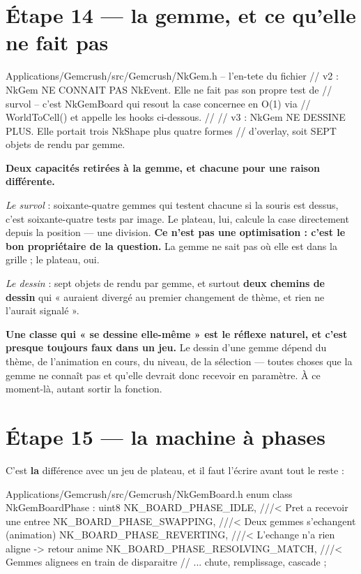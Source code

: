 \section{Étape 14 --- la gemme, et ce qu'elle ne fait pas}

\begin{nkcode}{Applications/Gemcrush/src/Gemcrush/NkGem.h -- l'en-tete du fichier}
// v2 : NkGem NE CONNAIT PAS NkEvent. Elle ne fait pas son propre test de
//      survol -- c'est NkGemBoard qui resout la case concernee en O(1) via
//      WorldToCell() et appelle les hooks ci-dessous.
//
// v3 : NkGem NE DESSINE PLUS. Elle portait trois NkShape plus quatre formes
//      d'overlay, soit SEPT objets de rendu par gemme.
\end{nkcode}

\begin{nkretenir}
\textbf{Deux capacités retirées à la gemme, et chacune pour une raison
différente.}

\emph{Le survol} : soixante-quatre gemmes qui testent chacune si la souris est
dessus, c'est soixante-quatre tests par image. Le plateau, lui, calcule la case
directement depuis la position --- une division. \textbf{Ce n'est pas une
optimisation : c'est le bon propriétaire de la question.} La gemme ne sait pas
où elle est dans la grille ; le plateau, oui.

\emph{Le dessin} : sept objets de rendu par gemme, et surtout \textbf{deux
chemins de dessin} qui « auraient divergé au premier changement de thème, et
rien ne l'aurait signalé ».
\end{nkretenir}

\begin{nkpiege}
\textbf{Une classe qui « se dessine elle-même » est le réflexe naturel, et c'est
presque toujours faux dans un jeu.} Le dessin d'une gemme dépend du thème, de
l'animation en cours, du niveau, de la sélection --- toutes choses que la gemme
ne connaît pas et qu'elle devrait donc recevoir en paramètre. À ce moment-là,
autant sortir la fonction.
\end{nkpiege}

\section{Étape 15 --- la machine à phases}

C'est \textbf{la} différence avec un jeu de plateau, et il faut l'écrire avant
tout le reste :

\begin{nkcode}{Applications/Gemcrush/src/Gemcrush/NkGemBoard.h}
enum class NkGemBoardPhase : uint8 {
    NK_BOARD_PHASE_IDLE,            ///< Pret a recevoir une entree
    NK_BOARD_PHASE_SWAPPING,        ///< Deux gemmes s'echangent (animation)
    NK_BOARD_PHASE_REVERTING,       ///< L'echange n'a rien aligne -> retour anime
    NK_BOARD_PHASE_RESOLVING_MATCH, ///< Gemmes alignees en train de disparaitre
    // ... chute, remplissage, cascade
};
\end{nkcode}

